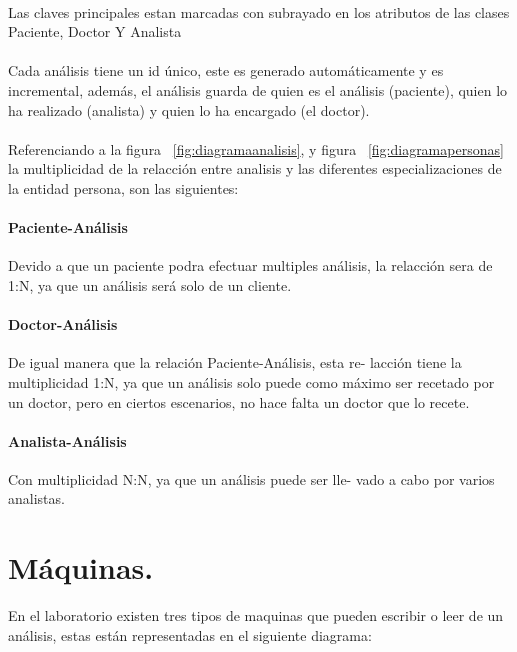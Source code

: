\documentclass[a4paper,10pt]{article}
\begin{document}
\paragraph{}
Las claves principales estan marcadas con subrayado en los atributos de las clases Paciente, Doctor Y Analista
\paragraph{}
Cada análisis tiene un id único, este es generado automáticamente y es incremental, además, el análisis guarda de quien es el análisis (paciente), quien lo ha realizado (analista) y quien lo ha encargado (el doctor).
\paragraph{}
Referenciando a la figura ~\ref{fig:diagramaanalisis}, y figura ~\ref{fig:diagramapersonas} la multiplicidad de la relacción entre analisis y las diferentes especializaciones de la entidad persona, son las siguientes:
\paragraph{Paciente-Análisis}
Devido a que un paciente podra efectuar multiples análisis, la relacción sera de 1:N, ya que un análisis será solo de un cliente.
\paragraph{Doctor-Análisis}
De igual manera que la relación Paciente-Análisis, esta re-
lacción tiene la multiplicidad 1:N, ya que un análisis solo puede como máximo
ser recetado por un doctor, pero en ciertos escenarios, no hace falta un doctor
que lo recete.

\paragraph{Analista-Análisis}
 Con multiplicidad N:N, ya que un análisis puede ser lle-
vado a cabo por varios analistas.

\section{Máquinas.}
En el laboratorio existen tres tipos de maquinas que pueden escribir o leer de un análisis, estas están representadas en el siguiente diagrama:
\end{document}
